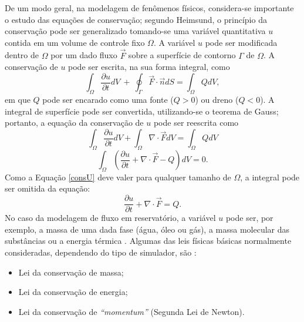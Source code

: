 De um modo geral, na modelagem de fen\^{o}menos f\'{i}sicos, considera-se importante o estudo das equa\c{c}\~{o}es de conserva\c{c}\~{a}o; segundo Heimsund, o princ\'{i}pio da conserva\c{c}\~{a}o pode ser generalizado tomando-se uma vari\'{a}vel quantitativa $u$ contida em um volume de controle fixo $\Omega$. A vari\'{a}vel $u$ pode ser modificada dentro de $\Omega$ por um dado fluxo $\vec{F}$ sobre a superf\'{i}cie de contorno $\Gamma$ de $\Omega$. A conserva\c{c}\~{a}o de $u$ pode ser escrita, na sua forma integral, como
\begin{equation}
	\int_{\Omega} \frac{\partial u}{\partial t}dV ~+~\oint_{\Gamma}\vec{F}\cdot\vec{n}dS = \int_{\Omega} Q dV,
\end{equation}
em que $Q$ pode ser encarado como uma fonte ($Q > 0$) ou dreno ($Q < 0$). A integral de superf\'{i}cie pode ser convertida, utilizando-se o teorema de Gauss; portanto, a equa\c{c}\~{a}o da conserva\c{c}\~{a}o de $u$ pode ser reescrita como
\begin{equation}
\int_{\Omega} \frac{\partial u}{\partial t}dV + \int_{\Omega} \nabla\cdot\vec{F} dV = \int_{\Omega}Q dV
\end{equation}
\begin{equation}\label{consU}
\int_{\Omega} \left(\frac{\partial u}{\partial t} + \nabla\cdot\vec{F} - Q \right)dV = 0.
\end{equation}
Como a Equa\c{c}\~{a}o \eqref{consU} deve valer para qualquer tamanho de $\Omega$, a integral pode ser omitida da equa\c{c}\~{a}o:
\begin{equation}\label{consU2}
\frac{\partial u}{\partial t} + \nabla\cdot\vec{F} = Q.
\end{equation}
No caso da modelagem de fluxo em reservat\'{o}rio, a vari\'{a}vel $u$ pode ser, por exemplo, a massa de uma dada fase (\'{a}gua, \'{o}leo ou g\'{a}s), a massa molecular das subst\^{a}ncias ou a energia t\'{e}rmica \cite{heimsund2005}. Algumas das leis f\'{i}sicas b\'{a}sicas normalmente  consideradas, dependendo do tipo de simulador, s\~{a}o \cite[p. 520]{engres}:

\begin{itemize}
	\item Lei da conserva\c{c}\~{a}o de massa;
	\item Lei da conserva\c{c}\~{a}o de energia;
	\item Lei da conserva\c{c}\~{a}o de \textit{``momentum''} (Segunda Lei de Newton).
\end{itemize}

